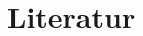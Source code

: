 \documentclass[colorBG,slideColor,8pt]{beamer}
\begin{document}
\section{Literatur}
\begin{frame}
\tableofcontents[currentsection]
\end{frame}

\begin{frame}
\begin{columns}
\begin{column}{0.9\linewidth}
\nocite{*}
\printbibliography
\end{column}
\end{columns}
\end{frame}
\end{document}

